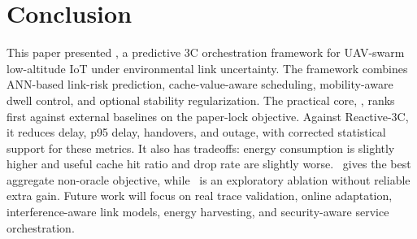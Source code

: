 \section{Conclusion}
This paper presented \pchorch, a predictive 3C orchestration framework for UAV-swarm low-altitude IoT under environmental link uncertainty. The framework combines ANN-based link-risk prediction, cache-value-aware scheduling, mobility-aware dwell control, and optional stability regularization. The practical core, \pclr, ranks first against external baselines on the paper-lock objective. Against Reactive-3C, it reduces delay, p95 delay, handovers, and outage, with corrected statistical support for these metrics. It also has tradeoffs: energy consumption is slightly higher and useful cache hit ratio and drop rate are slightly worse. \psr\ gives the best aggregate non-oracle objective, while \etp\ is an exploratory ablation without reliable extra gain. Future work will focus on real trace validation, online adaptation, interference-aware link models, energy harvesting, and security-aware service orchestration.

